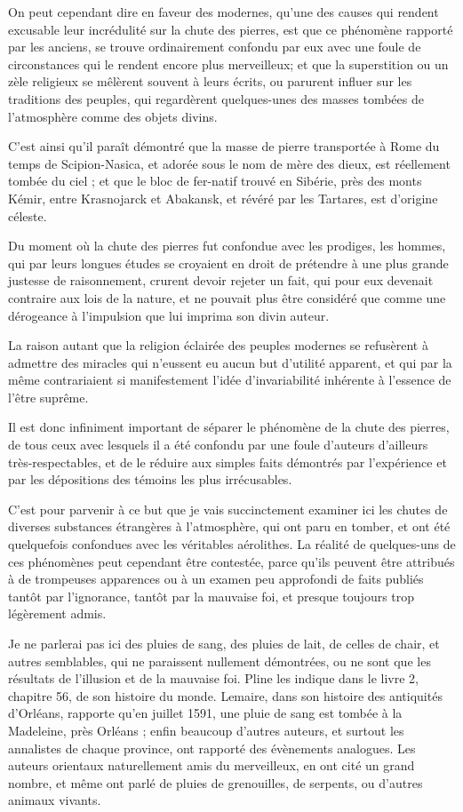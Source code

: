 \documentclass[a4paper, 12pt, oneside, french]{article}
\begin{document}
On peut cependant dire en faveur des modernes, qu'une des causes qui rendent excusable leur incrédulité sur la chute des pierres, est que ce phénomène rapporté par les anciens, se trouve ordinairement confondu par eux avec une foule de circonstances qui le rendent encore plus merveilleux; et que la superstition ou un zèle religieux se mêlèrent souvent à leurs écrits, ou parurent influer sur les traditions des peuples, qui regardèrent quelques-unes des masses tombées de l'atmosphère comme des objets divins.

C'est ainsi qu'il paraît démontré que la masse de pierre transportée à Rome du temps de Scipion-Nasica, et adorée sous le nom de mère des dieux, est réellement tombée du ciel ; et que le bloc de fer-natif trouvé en Sibérie, près des monts Kémir, entre Krasnojarck et Abakansk, et révéré par les Tartares, est d'origine céleste.

Du moment où la chute des pierres fut confondue avec les prodiges, les hommes, qui par leurs longues études se croyaient en droit de prétendre à une plus grande justesse de raisonnement, crurent devoir rejeter un fait, qui pour eux devenait contraire aux lois de la nature, et ne pouvait plus être considéré que comme une dérogeance à l'impulsion que lui imprima son divin auteur.

La raison autant que la religion éclairée des peuples modernes se refusèrent à admettre des miracles qui n'eussent eu aucun but d'utilité apparent, et qui par la même contrariaient si manifestement l'idée d'invariabilité inhérente à l'essence de l'être suprême.

Il est donc infiniment important de séparer le phénomène de la chute des pierres, de tous ceux avec lesquels il a été confondu par une foule d'auteurs d'ailleurs très-respectables, et de le réduire aux simples faits démontrés par l'expérience et par les dépositions des témoins les plus irrécusables.

C'est pour parvenir à ce but que je vais succinctement examiner ici les chutes de diverses substances étrangères à l'atmosphère, qui ont paru en tomber, et ont été quelquefois confondues avec les véritables aérolithes. La réalité de quelques-uns de ces phénomènes peut cependant être contestée, parce qu'ils peuvent être attribués à de trompeuses apparences ou à un examen peu approfondi de faits publiés tantôt par l'ignorance, tantôt par la mauvaise foi, et presque toujours trop légèrement admis.

Je ne parlerai pas ici des pluies de sang, des pluies de lait, de celles de chair, et autres semblables, qui ne paraissent nullement démontrées, ou ne sont que les résultats de l'illusion et de la mauvaise foi. Pline les indique dans le livre 2, chapitre 56, de son histoire du monde. Lemaire, dans son histoire des antiquités d'Orléans, rapporte qu'en juillet 1591, une pluie de sang est tombée à la Madeleine, près Orléans ; enfin beaucoup d'autres auteurs, et surtout les annalistes de chaque province, ont rapporté des évènements analogues. Les auteurs orientaux naturellement amis du merveilleux, en ont cité un grand nombre, et même ont parlé de pluies de grenouilles, de serpents, ou d'autres animaux vivants.
\end{document}
